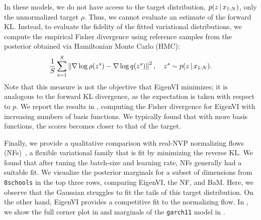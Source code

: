 In these models, we do not have access to the target distribution, $p(z \,|\, x_{1:N})$,
only the unnormalized target $\rho$.
Thus, we cannot evaluate an estimate of the forward KL.
Instead, to evaluate the fidelity of the fitted variational distributions,
we compute the empirical Fisher divergence using reference samples from the posterior
obtained via Hamiltonian Monte Carlo (HMC):
\begin{align}
\frac{1}{S} \sum_{s=1}^S \left\lVert\nabla \log \rho(z^s) - \nabla \log q(z^s)\right\rVert^2,
    \quad z^s \sim p(z \,|\, x_{1:N}).
\end{align}
Note that this measure is not the objective that EigenVI minimizes; it is analogous to the forward KL
divergence, as the expectation is taken with respect to $p$.
%
We report the results in ,
computing the Fisher divergence for EigenVI with increasing numbers
of basis functions.
We typically found that with more basis functions,
the scores becomes closer to that of the target.


Finally, we provide a qualitative comparison with real-NVP
normalizing flows (NFs)~\cite{dinh2016density}, a flexible variational
family that is fit by   minimizing the reverse KL.
We found that after tuning the batch-size and learning rate,
NFs generally had a suitable fit.
We visualize the posterior marginals  for a subset of dimensions from \texttt{8schools} in
the top three rows, comparing EigenVI, the NF, and BaM.
%
Here, we observe that the Gaussian struggles to fit the tails
of this target distribution.
On the other hand, EigenVI provides a competitive fit to the normalizing flow.
In ,
we show the full corner plot in  and marginals of
the \texttt{garch11} model  in  .




%

